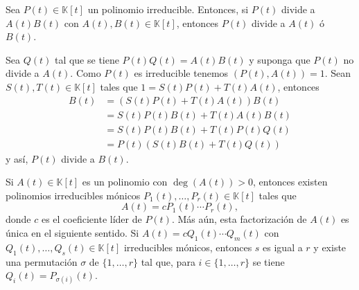 \begin{lema}
Sea $P(t)\in \mathbb{K}[t]$ un polinomio irreducible. Entonces, si $P(t)$ divide a $A(t)B(t)$ con $A(t),B(t)\in \mathbb{K}[t]$, entonces $P(t)$ divide a $A(t)$ \'o $B(t)$.
\end{lema}

\dem Sea $Q(t)$ tal que se tiene $P(t)Q(t)=A(t)B(t)$ y suponga que $P(t)$ no divide a $A(t)$. Como $P(t)$ es irreducible tenemos $\left(P(t),A(t)\right)=1$. Sean $S(t),T(t)\in \mathbb{K}[t]$ tales que $1=S(t)P(t)+T(t)A(t)$, entonces
\begin{align*}
B(t) & =(S(t)P(t)+T(t)A(t))B(t)\\
& =S(t)P(t)B(t)+T(t)A(t)B(t)\\
& =S(t)P(t)B(t)+T(t)P(t)Q(t)\\
& =P(t)\left(S(t)B(t)+T(t)Q(t)\right)
\end{align*}
y así, $P(t)$ divide a $B(t)$.

\begin{teo}
Si $A(t)\in \mathbb{K}[t]$ es un polinomio con $\deg(A(t))>0$, entonces existen polinomios irreducibles mónicos $P_1(t),\ldots,P_r(t)\in \mathbb{K}[t]$ tales que
$$A(t)=cP_1(t)\cdots P_r(t),$$
donde $c$ es el coeficiente líder de $P(t)$. Más aún, esta factorización de $A(t)$ es única en el siguiente sentido. Si $A(t)=cQ_1(t)\cdots Q_m(t)$ con $Q_1(t),\ldots,Q_s(t)\in \mathbb{K}[t]$ irreducibles mónicos, entonces $s$ es igual a $r$ y existe una permutación $\sigma$ de $\{1,\ldots,r\}$ tal que, para $i\in\{1,\ldots,r\}$ se tiene $Q_i(t)=P_{\sigma(i)}(t)$.
\end{teo}

